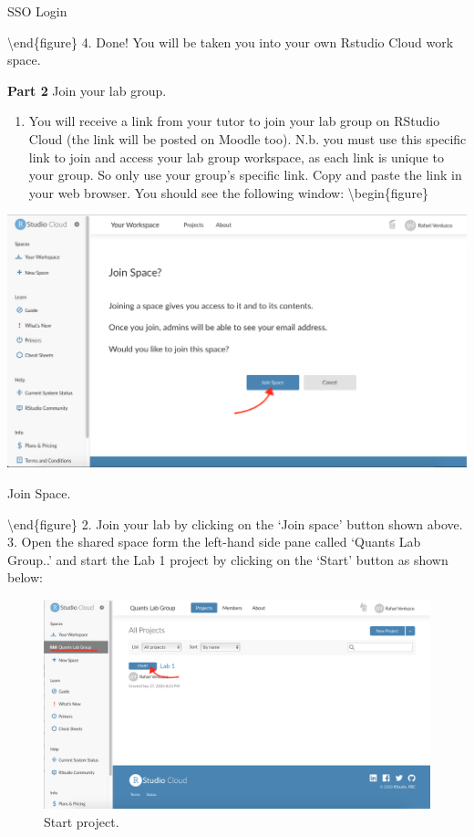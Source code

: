 \documentclass[
]{book}
\providecommand{\tightlist}{%
  \setlength{\itemsep}{0pt}\setlength{\parskip}{0pt}}
\begin{document}
\caption{SSO Login}

\label{fig:unnamed-chunk-2}
\textbackslash end\{figure\}
4. Done! You will be taken you into your own Rstudio Cloud work space.

\textbf{Part 2} Join your lab group.

\begin{enumerate}
\def\labelenumi{\arabic{enumi}.}
\tightlist
\item
  You will receive a link from your tutor to join your lab group on RStudio Cloud (the link will be posted on Moodle too). N.b. you must use this specific link to join and access your lab group workspace, as each link is unique to your group. So only use your group's specific link. Copy and paste the link in your web browser. You should see the following window:
  \textbackslash begin\{figure\}
\end{enumerate}

\includegraphics[width=1\linewidth]{./images/rstudio_cloud_joinspace} \hfill{}

\caption{Join Space.}

\label{fig:unnamed-chunk-3}
\textbackslash end\{figure\}
2. Join your lab by clicking on the `Join space' button shown above.
3. Open the shared space form the left-hand side pane called `Quants Lab Group..' and start the Lab 1 project by clicking on the `Start' button as shown below:

\begin{figure}

\includegraphics[width=1\linewidth]{./images/rstudio_cloud_startproject} \hfill{}

\caption{Start project.}\label{fig:unnamed-chunk-4}
\end{figure}
\end{document}
